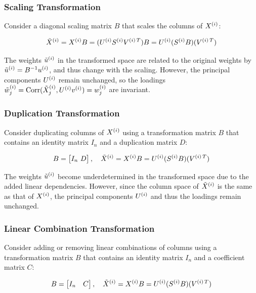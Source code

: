 \subsubsection{Scaling Transformation}
Consider a diagonal scaling matrix $B$ that scales the columns of $X^{(i)}$:

\begin{align}
\tilde{X}^{(i)} = X^{(i)}B = (U^{(i)}S^{(i)}V^{(i)\,T})B = U^{(i)}(S^{(i)}B)(V^{(i)\,T}) \label{eq:scaling}
\end{align}

The weights $\tilde{u}^{(i)}$ in the transformed space are related to the original weights by $\tilde{u}^{(i)} = B^{-1}u^{(i)}$, and thus change with the scaling. However, the principal components $U^{(i)}$ remain unchanged, so the loadings $\tilde{w}^{(i)}_j = \operatorname{Corr}(\tilde{X}^{(i)}_j, U^{(i)}v^{(i)}) = w^{(i)}_j$ are invariant.

\subsubsection{Duplication Transformation}
Consider duplicating columns of $X^{(i)}$ using a transformation matrix $B$ that contains an identity matrix $I_n$ and a duplication matrix $D$:

\begin{align}
B = \begin{bmatrix}
I_n \
D
\end{bmatrix}, \quad
\tilde{X}^{(i)} = X^{(i)}B = U^{(i)}(S^{(i)}B)(V^{(i)\,T}) \label{eq:duplication}
\end{align}

The weights $\tilde{u}^{(i)}$ become underdetermined in the transformed space due to the added linear dependencies. However, since the column space of $\tilde{X}^{(i)}$ is the same as that of $X^{(i)}$, the principal components $U^{(i)}$ and thus the loadings remain unchanged.

\subsubsection{Linear Combination Transformation}
Consider adding or removing linear combinations of columns using a transformation matrix $B$ that contains an identity matrix $I_n$ and a coefficient matrix $C$:

\begin{align}
B = \begin{bmatrix}
I_n & C
\end{bmatrix}, \quad
\tilde{X}^{(i)} = X^{(i)}B = U^{(i)}(S^{(i)}B)(V^{(i)\,T}) \label{eq:linear_combination}
\end{align}

